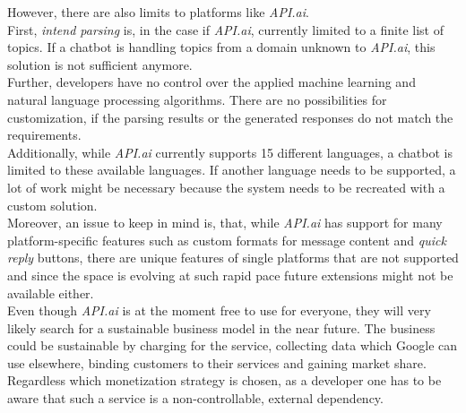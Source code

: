 However, there are also limits to platforms like \emph{API.ai}.
\\
First, \emph{intend parsing} is, in the case if \emph{API.ai}, currently limited to a finite list of topics.
If a chatbot is handling topics from a domain unknown to \emph{API.ai}, this solution is not sufficient anymore.
\\
Further, developers have no control over the applied machine learning and natural language processing algorithms.
There are no possibilities for customization, if the parsing results or the generated responses do not match the requirements.
\\
Additionally, while \emph{API.ai} currently supports 15 different languages, a chatbot is limited to these available languages.
If another language needs to be supported, a lot of work might be necessary because the system needs to be recreated with a custom solution.
\\
Moreover, an issue to keep in mind is, that, while \emph{API.ai} has support for many platform-specific features such as custom formats for message content and \emph{quick reply} buttons,
there are unique features of single platforms that are not supported
and since the space is evolving at such rapid pace future extensions might not be available either.
\\
Even though \emph{API.ai} is at the moment free to use for everyone,
they will very likely search for a sustainable business model in the near future.
The business could be sustainable by charging for the service, collecting data which Google can use elsewhere, binding customers to their services and gaining market share.
\\
Regardless which monetization strategy is chosen, as a developer one has to be aware that such a service is a non-controllable, external dependency.
